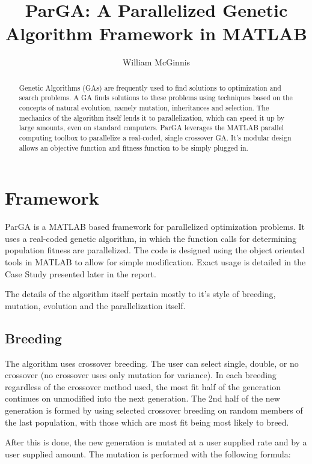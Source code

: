\documentclass[conference]{IEEEtran}
\title{ParGA: A Parallelized Genetic Algorithm Framework in MATLAB}
\author{William McGinnis}
\begin{document}
\maketitle
\begin{abstract}
Genetic Algorithms (GAs) are frequently used to find solutions to optimization and search problems. A GA finds solutions to these problems using techniques based on the concepts of natural evolution, namely mutation, inheritances and selection.  The mechanics of the algorithm itself lends it to parallelization, which can speed it up by large amounts, even on standard computers.  ParGA leverages the MATLAB parallel computing toolbox to parallelize a real-coded, single crossover GA.  It's modular design allows an objective function and fitness function to be simply plugged in.
\end{abstract}

\section{Framework}

ParGA is a MATLAB based framework for parallelized optimization problems.  It uses a real-coded genetic algorithm, in which the function calls for determining population fitness are parallelized.  The code is designed using the object oriented tools in MATLAB to allow for simple modification.  Exact usage is detailed in the Case Study presented later in the report.

The details of the algorithm itself pertain mostly to it's style of breeding, mutation, evolution and the parallelization itself.  

\subsection{Breeding}

The algorithm uses crossover breeding.  The user can select single, double, or no crossover (no crossover uses only mutation for variance).  In each breeding regardless of the crossover method used, the most fit half of the generation continues on unmodified into the next generation.  The 2nd half of the new generation is formed by using selected crossover breeding on random members of the last population, with those which are most fit being most likely to breed.

After this is done, the new generation is mutated at a user supplied rate and by a user supplied amount.  The mutation is performed with the following formula:
\end{document}
